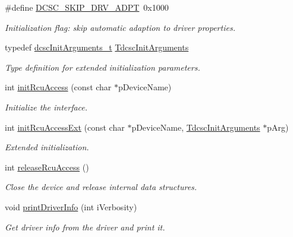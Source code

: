 \begin{CompactItemize}
\#define \hyperlink{group__dcsc__msg__buffer__access_g1d0799f8bf0c0b77db6155e5d78a4619}{DCSC\_\-SKIP\_\-DRV\_\-ADPT}~0x1000
\begin{CompactList}\small\item\em Initialization flag: skip automatic adaption to driver properties. \item\end{CompactList}\item 
typedef \hyperlink{structdcscInitArguments__t}{dcsc\-Init\-Arguments\_\-t} \hyperlink{group__dcsc__msg__buffer__access_gc35123ecbeaf4345c7ea161d1d31b500}{Tdcsc\-Init\-Arguments}
\begin{CompactList}\small\item\em Type definition for extended initialization parameters. \item\end{CompactList}\item 
int \hyperlink{group__dcsc__msg__buffer__access_gfc4448a8f5f9654cf54ad494f1558594}{init\-Rcu\-Access} (const char $\ast$p\-Device\-Name)
\begin{CompactList}\small\item\em Initialize the interface. \item\end{CompactList}\item 
int \hyperlink{group__dcsc__msg__buffer__access_g95f13464dd4da9231a53e7adbb0e7d4e}{init\-Rcu\-Access\-Ext} (const char $\ast$p\-Device\-Name, \hyperlink{structdcscInitArguments__t}{Tdcsc\-Init\-Arguments} $\ast$p\-Arg)
\begin{CompactList}\small\item\em Extended initialization. \item\end{CompactList}\item 
int \hyperlink{group__dcsc__msg__buffer__access_gac62a9e57c67af4cb9178b4426ec12fb}{release\-Rcu\-Access} ()
\begin{CompactList}\small\item\em Close the device and release internal data structures. \item\end{CompactList}\item 
void \hyperlink{group__dcsc__msg__buffer__access_g919bc832f5a0e82c07cfafd699b1b2ea}{print\-Driver\-Info} (int i\-Verbosity)
\begin{CompactList}\small\item\em Get driver info from the driver and print it. \item\end{CompactList}\item 

\end{CompactItemize}
